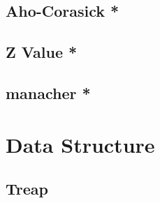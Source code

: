 \documentclass[a4paper,10pt,twocolumn,oneside]{article}
\begin{document}
% 

\subsection{Aho-Corasick *}


\subsection{Z Value *}


% 

\subsection{manacher *}


% 

%

% 

\section{Data Structure}

\subsection{Treap}

\end{document}
